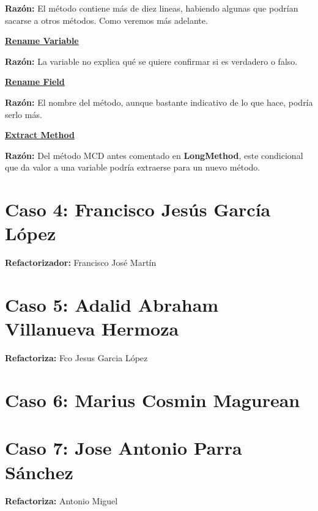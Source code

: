\documentclass[11pt,a4paper,oneside]{book}
\begin{document}
    \textbf{Razón:} El método contiene más de diez lineas, habiendo algunas que podrían sacarse a otros métodos. Como veremos más adelante.
    
    
    
    \hyperref[renamevariable]{\textbf{Rename Variable}}
    
    \textbf{Razón:} La variable no explica qué se quiere confirmar si es verdadero o falso.
    
    
    
    \hyperref[renamefield]{\textbf{Rename Field}}
    
    \textbf{Razón:} El nombre del método, aunque bastante indicativo de lo que hace, podría serlo más.
    
    
    
    \hyperref[extractmethod]{\textbf{Extract Method}}
    
    \textbf{Razón:} Del método MCD antes comentado en \textbf{LongMethod}, este condicional que da valor a una variable podría extraerse para un nuevo método.
    
    
    
    


\chapter {Caso 4: Francisco Jesús García López}
\textbf{Refactorizador:} Francisco José Martín







\chapter {Caso 5: Adalid Abraham Villanueva Hermoza}
\textbf{Refactoriza:} Fco Jesus Garcia López


\chapter {Caso 6: Marius Cosmin Magurean}

\chapter {Caso 7: Jose Antonio Parra Sánchez}
\textbf{Refactoriza:} Antonio Miguel
\end{document}
